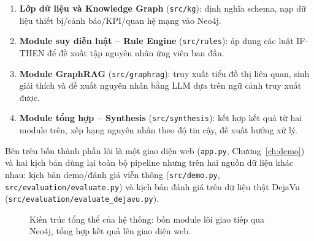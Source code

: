 \documentclass[12pt,a4paper]{report}
\newcommand{\code}[1]{\texttt{\small #1}}
\begin{document}
\begin{enumerate}[label=(\arabic*)]
    \item \textbf{Lớp dữ liệu và Knowledge Graph} (\code{src/kg}): định nghĩa schema, nạp dữ liệu
    thiết bị/cảnh báo/KPI/quan hệ mạng vào Neo4j.
    \item \textbf{Module suy diễn luật -- Rule Engine} (\code{src/rules}): áp dụng các luật
    IF-THEN để đề xuất tập nguyên nhân ứng viên ban đầu.
    \item \textbf{Module GraphRAG} (\code{src/graphrag}): truy xuất tiểu đồ thị liên quan, sinh
    giải thích và đề xuất nguyên nhân bằng LLM dựa trên ngữ cảnh truy xuất được.
    \item \textbf{Module tổng hợp -- Synthesis} (\code{src/synthesis}): kết hợp kết quả từ hai
    module trên, xếp hạng nguyên nhân theo độ tin cậy, đề xuất hướng xử lý.
\end{enumerate}

Bên trên bốn thành phần lõi là một giao diện web (\code{app.py}, Chương~\ref{ch:demo}) và hai kịch
bản dùng lại toàn bộ pipeline nhưng trên hai nguồn dữ liệu khác nhau: kịch bản demo/đánh giá viễn
thông (\code{src/demo.py}, \code{src/evaluation/evaluate.py}) và kịch bản đánh giá trên dữ liệu
thật DejaVu (\code{src/evaluation/evaluate\_dejavu.py}).

\begin{figure}[H]
\centering
{}
\caption{Kiến trúc tổng thể của hệ thống: bốn module lõi giao tiếp qua Neo4j, tổng hợp kết quả
lên giao diện web.}
\label{fig:kientruc}
\end{figure}
\end{document}

